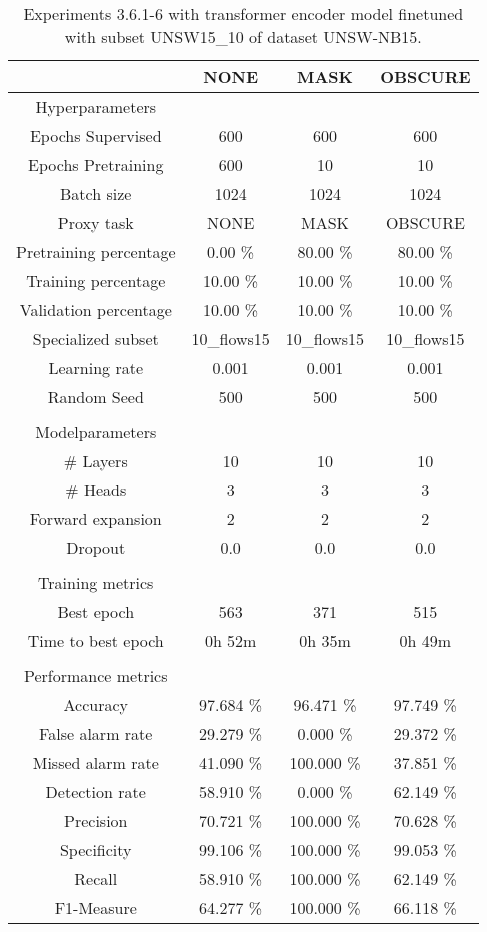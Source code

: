 \begin{table}[htb]
    \centering
    \begin{tabular}{@{}cccc@{}}
        \toprule
         &  NONE &  MASK &  OBSCURE \\
        \midrule
        Hyperparameters &  &  &  \\
        Epochs Supervised &  600 &  600 &  600 \\
        Epochs Pretraining &  600 &  10 &  10 \\
        Batch size &  1024 &  1024 &  1024 \\
        Proxy task &  NONE &  MASK &  OBSCURE \\
        Pretraining percentage &  0.00 \% &  80.00 \% &  80.00 \% \\
        Training percentage &  10.00 \% &  10.00 \% &  10.00 \% \\
        Validation percentage &  10.00 \% &  10.00 \% &  10.00 \% \\
        Specialized subset &  10\_flows15 &  10\_flows15 &  10\_flows15 \\
        Learning rate &  0.001 &  0.001 &  0.001 \\
        Random Seed &  500 &  500 &  500 \\
         \\
        Modelparameters &  &  &  \\
        \# Layers &  10 &  10 &  10 \\
        \# Heads &  3 &  3 &  3 \\
        Forward expansion &  2 &  2 &  2 \\
        Dropout &  0.0 &  0.0 &  0.0 \\
         \\
        Training metrics &  &  &  \\
        Best epoch &  563 &  371 &  515 \\
        Time to best epoch &  0h 52m &  0h 35m &  0h 49m \\
         \\
        Performance metrics &  &  &  \\
        Accuracy &  97.684 \% &  96.471 \% &  97.749 \% \\
        False alarm rate &  29.279 \% &  0.000 \% &  29.372 \% \\
        Missed alarm rate &  41.090 \% &  100.000 \% &  37.851 \% \\
        Detection rate &  58.910 \% &  0.000 \% &  62.149 \% \\
        Precision &  70.721 \% &  100.000 \% &  70.628 \% \\
        Specificity &  99.106 \% &  100.000 \% &  99.053 \% \\
        Recall &  58.910 \% &  100.000 \% &  62.149 \% \\
        F1-Measure &  64.277 \% &  100.000 \% &  66.118 \% \\
        \bottomrule
    \end{tabular}
    \caption{Experiments 3.6.1-6 with transformer encoder model finetuned with subset UNSW15\_10 of dataset UNSW-NB15.}
    \label{table:results:lstm:stats_flows15_subset}
\end{table}